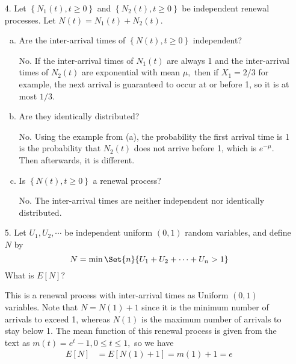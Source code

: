 \documentclass{article}
\begin{document}
\begin{itemize}
\begin{enumerate}[(a)]
		\end{enumerate}

	\item[4.] Let $\left\{ N_1(t), t\ge 0 \right\}$ and $\left\{ N_2(t), t\ge 0 \right\}$ be independent renewal processes. Let $N(t)=N_1(t)+N_2(t).$
		\begin{enumerate}[(a)]
			\item Are the inter-arrival times of $\left\{ N(t), t\ge 0 \right\}$ independent?
				\begin{answer*}
					No. If the inter-arrival times of $N_1(t)$ are always 1 and the inter-arrival times of $N_2(t)$ are exponential with mean $\mu,$ then if $X_1=2/3$ for example, the next arrival is guaranteed to occur at or before 1, so it is at most $1/3.$
				\end{answer*}

			\item Are they identically distributed?
				\begin{answer*}
					No. Using the example from (a), the probability the first arrival time is 1 is the probability that $N_2(t)$ does not arrive before 1, which is $e^{-\mu}.$ Then afterwards, it is different.
				\end{answer*}

			\item Is $\left\{ N(t), t\ge 0 \right\}$ a renewal process?
				\begin{answer*}
					No. The inter-arrival times are neither independent nor identically distributed.
				\end{answer*}
				
		\end{enumerate}

	\item[5.] Let $U_1, U_2, \cdots$ be independent uniform $(0, 1)$ random variables, and define $N$ by
		\[N=\min\Set{n}{U_1+U_2+\cdots+U_n>1}\]
		What is $E[N]?$
		\begin{soln}
			This is a renewal process with inter-arrival times as Uniform $(0, 1)$ variables. Note that $N=N(1) + 1$ since it is the minimum number of arrivals to exceed 1, whereas $N(1)$ is the maximum number of arrivals to stay below 1. The mean function of this renewal process is given from the text as $m(t)=e^t-1, 0\le t\le 1,$ so we have
			\begin{align*}
				E[N] &= E[N(1) + 1] = m(1) + 1 = e
			\end{align*}
		\end{soln}


\end{itemize}
\end{document}
